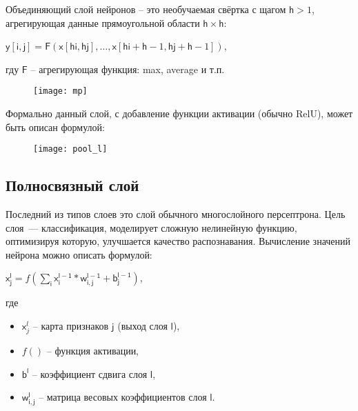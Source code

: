 \documentclass[11pt,colorlinks=true]{article}
\begin{document}
 Объединяющий слой нейронов -- это необучаемая свёртка с щагом $\mathsf{h} >1$, агрегирующая данные прямоугольной области $\mathsf{h} \times \mathsf{h}$:

    \begin{center}
    	$\mathsf{y}[\mathsf{i},\mathsf{j}] = \mathsf{F}(\mathsf{x}[\mathsf{hi},\mathsf{hj}],\dots,\mathsf{x}[\mathsf{hi} + \mathsf{h} - 1, \mathsf{hj} + \mathsf{h} - 1])$,
    \end{center}
гду $\mathsf{F}$ -- агрегирующая функция: max, average и т.п.

\begin{figure}[h]
	\begin{center}
		\begin{minipage}[h]{1\linewidth}
			\texttt{[image: mp]}
		\end{minipage}
	\end{center}
\end{figure}

Формально данный слой, с добавление функции активации (обычно RelU), может быть описан формулой: 

\begin{figure}[h]
	\begin{center}
		\begin{minipage}[h]{1\linewidth}
			\texttt{[image: pool\_l]}
		\end{minipage}
	\end{center}
\end{figure}

\subsection{Полносвязный слой}

Последний из типов слоев это слой обычного многослойного персептрона. Цель слоя~--- классификация, моделирует сложную нелинейную функцию, оптимизируя которую, улучшается качество распознавания. Вычисление значений нейрона можно описать формулой:
	\begin{center}
		$\mathsf{x}_{\mathsf{j}}^{\mathsf{l}} = f(\sum \limits_{\mathsf{i}} \mathsf{x}_{\mathsf{i}}^{\mathsf{l-1}} * \mathsf{w}_{\mathsf{i,j}}^{\mathsf{l-1}}+\mathsf{b}_{\mathsf{j}}^{\mathsf{l-1}})$,
	\end{center}
	где
	\begin{itemize}
		\item $\mathsf{x}_{j}^{l}$ -- карта признаков $\mathsf{j}$ (выход слоя $\mathsf{l}$), 
		\item $f()$ -- функция активации,
		\item $\mathsf{b}^{\mathsf{l}}$ -- коэффициент сдвига слоя $\mathsf{l}$,
		\item $\mathsf{w}_{\mathsf{i,j}}^{\mathsf{l}}$ -- матрица весовых коэффициентов слоя $\mathsf{l}$.
	\end{itemize}
\end{document}
